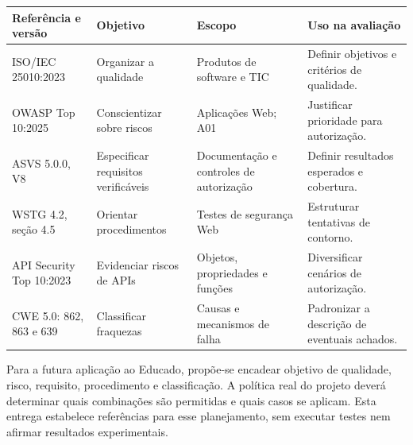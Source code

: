 {\def\LTcaptype{none} %
\begin{longtable}[]{@{}
  >{\raggedright\arraybackslash}p{}
  >{\raggedright\arraybackslash}p{}
  >{\raggedright\arraybackslash}p{}
  >{\raggedright\arraybackslash}p{}@{}}
\toprule\noalign{}
\begin{minipage}[b]{\linewidth}\raggedright
Referência e versão
\end{minipage} & \begin{minipage}[b]{\linewidth}\raggedright
Objetivo
\end{minipage} & \begin{minipage}[b]{\linewidth}\raggedright
Escopo
\end{minipage} & \begin{minipage}[b]{\linewidth}\raggedright
Uso na avaliação
\end{minipage} \\
\midrule\noalign{}
\endhead
\bottomrule\noalign{}
\endlastfoot
ISO/\allowbreak{}IEC 25010:2023 & Organizar a qualidade & Produtos de software e TIC
& Definir objetivos e critérios de qualidade. \\
OWASP Top 10:2025 & Conscientizar sobre riscos & Aplicações Web; A01 &
Justificar prioridade para autorização. \\
ASVS 5.0.0, V8 & Especificar requisitos verificáveis & Documentação e
controles de autorização & Definir resultados esperados e cobertura. \\
WSTG 4.2, seção 4.5 & Orientar procedimentos & Testes de segurança Web &
Estruturar tentativas de contorno. \\
API Security Top 10:2023 & Evidenciar riscos de APIs & Objetos,
propriedades e funções & Diversificar cenários de autorização. \\
CWE 5.0: 862, 863 e 639 & Classificar fraquezas & Causas e mecanismos de
falha & Padronizar a descrição de eventuais achados. \\
\end{longtable}
}

Para a futura aplicação ao Educado, propõe-se encadear objetivo de
qualidade, risco, requisito, procedimento e classificação. A política
real do projeto deverá determinar quais combinações são permitidas e
quais casos se aplicam. Esta entrega estabelece referências para esse
planejamento, sem executar testes nem afirmar resultados experimentais.

